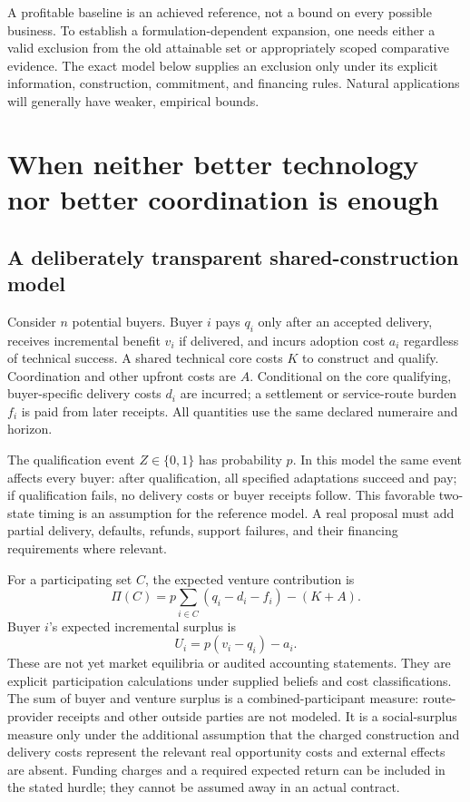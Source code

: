 \documentclass[11pt,letterpaper]{article}
\theoremstyle{remark}\newtheorem{remark}{Remark}[section]
\begin{document}
A profitable baseline is an achieved reference, not a bound on every possible business. To establish a formulation-dependent expansion, one needs either a valid exclusion from the old attainable set or appropriately scoped comparative evidence. The exact model below supplies an exclusion only under its explicit information, construction, commitment, and financing rules. Natural applications will generally have weaker, empirical bounds.

\section{When neither better technology nor better coordination is enough}
\label{sec:theory}
\subsection{A deliberately transparent shared-construction model}
Consider $n$ potential buyers. Buyer $i$ pays $q_i$ only after an accepted delivery, receives incremental benefit $v_i$ if delivered, and incurs adoption cost $a_i$ regardless of technical success. A shared technical core costs $K$ to construct and qualify. Coordination and other upfront costs are $A$. Conditional on the core qualifying, buyer-specific delivery costs $d_i$ are incurred; a settlement or service-route burden $f_i$ is paid from later receipts. All quantities use the same declared numeraire and horizon.

The qualification event $Z\in\{0,1\}$ has probability $p$. In this model the same event affects every buyer: after qualification, all specified adaptations succeed and pay; if qualification fails, no delivery costs or buyer receipts follow. This favorable two-state timing is an assumption for the reference model. A real proposal must add partial delivery, defaults, refunds, support failures, and their financing requirements where relevant.

For a participating set $C$, the expected venture contribution is
\begin{equation}\label{eq:profit}
\Pi(C)=p\sum_{i\in C}(q_i-d_i-f_i)-(K+A).
\end{equation}
Buyer $i$'s expected incremental surplus is
\begin{equation}\label{eq:buyer}
U_i=p(v_i-q_i)-a_i.
\end{equation}
These are not yet market equilibria or audited accounting statements. They are explicit participation calculations under supplied beliefs and cost classifications. The sum of buyer and venture surplus is a combined-participant measure: route-provider receipts and other outside parties are not modeled. It is a social-surplus measure only under the additional assumption that the charged construction and delivery costs represent the relevant real opportunity costs and external effects are absent. Funding charges and a required expected return can be included in the stated hurdle; they cannot be assumed away in an actual contract.
\end{document}
